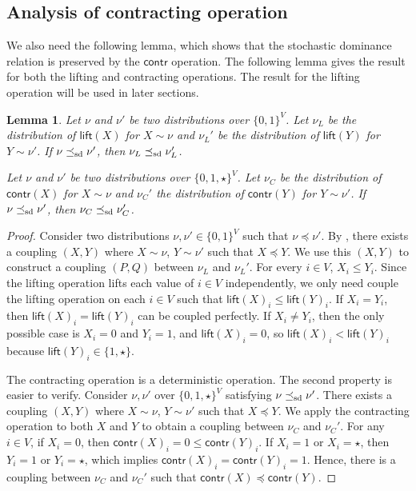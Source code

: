 \documentclass[11pt,a4paper]{article}
\newcommand{\sd}{\preceq_{\textnormal{sd}}}
\newtheorem{lemma}[theorem]{Lemma}
\theoremstyle{definition}
\begin{document}
\subsection{Analysis of contracting operation}\label{sec:analysis-of-contracting-operation}
We also need the following lemma, which shows that the stochastic dominance relation is preserved by the $\textsf{contr}$ operation. The following lemma gives the result for both the lifting and contracting operations. The result for the lifting operation will be used in later sections.
\begin{lemma}\label{lem:lift-and-contr-keep-dominate} 
Let $\nu$ and $\nu'$ be two distributions over $\{0,1\}^V$. Let $\nu_{L}$ be the distribution of $\textsf{lift}(X)$ for $X \sim \nu$ and $\nu_{L}'$ be the distribution of $\textsf{lift}(Y)$ for $Y \sim \nu'$. If $\nu \sd \nu'$, then $\nu_{L} \sd \nu_{L}'$.

Let $\nu$ and $\nu'$ be two distributions over  $\{0,1,\star\}^V$. Let $\nu_{C}$ be the distribution of $\textsf{contr}(X)$ for $X \sim \nu$ and $\nu_{C}'$ the distribution of $\textsf{contr}(Y)$ for $Y \sim \nu'$. If $\nu \sd \nu'$, then $\nu_{C} \sd \nu_{C}'$.
\end{lemma}
\begin{proof}   
Consider two distributions $\nu,\nu'\in \{0,1\}^V$ such that $\nu\preceq\nu'$. By , there exists a coupling $(X,Y)$ where $X\sim \nu$, $Y\sim \nu'$ such that $X\preceq Y$. We use this $(X,Y)$ to construct a coupling $(P,Q)$ between $\nu_L$ and $\nu_L'$.
For every $i\in V$, $X_i\leq Y_i$. Since the lifting operation lifts each value of $i\in V$ independently, we only need couple the lifting operation on each $i \in V$ such that $\textsf{lift}(X)_i\leq \textsf{lift}(Y)_i$.
If $X_i=Y_i$, then $\textsf{lift}(X)_i=\textsf{lift}(Y)_i$ can be coupled perfectly. If $X_i \neq Y_i$, then the only possible case is $X_i=0$ and $Y_i=1$, and $\textsf{lift}(X)_i=0$, so $\textsf{lift}(X)_i < \textsf{lift}(Y)_i$ because $\textsf{lift}(Y)_i \in \{1,\star\}$.

The contracting operation is a deterministic operation. The second property is easier to verify. 
Consider $\nu,\nu'$ over $\{0,1,\star\}^V$ satisfying $\nu\sd \nu'$.
There exists a coupling $(X,Y)$ where $X\sim \nu$, $Y\sim \nu'$ such that $X\preceq Y$.
We apply the contracting operation to both $X$ and $Y$ to obtain a coupling between $\nu_C$ and $\nu_C'$.
For any $i\in V$, if $X_i=0$, then $\textsf{contr}(X)_i=0\leq \textsf{contr}(Y)_i$. If $X_i=1$ or $X_i=\star$, then $Y_i=1$ or $Y_i=\star$, which implies $\textsf{contr}(X)_i= \textsf{contr}(Y)_i=1$. Hence, there is a coupling between $\nu_C$ and $\nu_C'$ such that $\textsf{contr}(X) \preceq \textsf{contr}(Y)$.
\end{proof}
\end{document}
